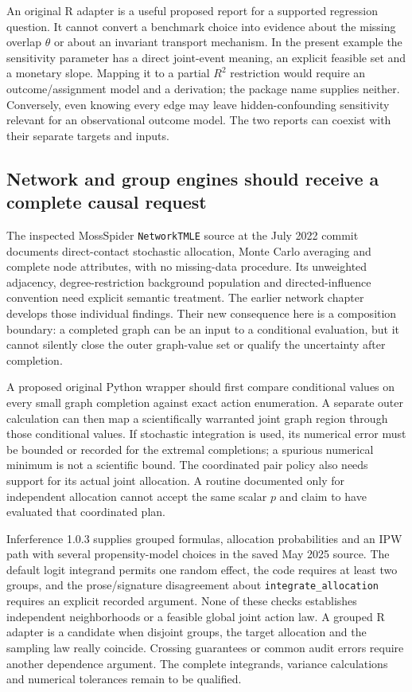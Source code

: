 An original R adapter is a useful proposed report for a supported regression
question. It cannot convert a benchmark choice into evidence about the
missing overlap $\theta$ or about an invariant transport mechanism. In the
present example the sensitivity parameter has a direct joint-event meaning,
an explicit feasible set and a monetary slope. Mapping it to a partial
$R^2$ restriction would require an outcome/assignment model and a derivation;
the package name supplies neither. Conversely, even knowing every edge may
leave hidden-confounding sensitivity relevant for an observational outcome
model. The two reports can coexist with their separate targets and inputs.

\subsection{Network and group engines should receive a complete causal request}

The inspected MossSpider \texttt{NetworkTMLE} source at the July 2022 commit
documents direct-contact stochastic allocation, Monte Carlo averaging and
complete node attributes, with no missing-data procedure. Its unweighted
adjacency, degree-restriction background population and directed-influence
convention need explicit semantic treatment.\citep{v13_sw_mossspider}
The earlier network chapter develops those individual findings. Their new
consequence here is a composition boundary: a completed graph can be an
input to a conditional evaluation, but it cannot silently close the outer
graph-value set or qualify the uncertainty after completion.

A proposed original Python wrapper should first compare conditional values
on every small graph completion against exact action enumeration. A separate
outer calculation can then map a scientifically warranted joint graph region
through those conditional values. If stochastic integration is used, its
numerical error must be bounded or recorded for the extremal completions;
a spurious numerical minimum is not a scientific bound. The coordinated
pair policy also needs support for its actual joint allocation. A routine
documented only for independent allocation cannot accept the same scalar
$p$ and claim to have evaluated that coordinated plan.

Inferference 1.0.3 supplies grouped formulas, allocation probabilities and an
IPW path with several propensity-model choices in the saved May 2025 source.
The default logit integrand permits one random effect, the code requires at
least two groups, and the prose/signature disagreement about
\texttt{integrate\_allocation} requires an explicit recorded argument.
\citep{v13_sw_inferference} None of these checks establishes independent
neighborhoods or a feasible global joint action law. A grouped R adapter is
a candidate when disjoint groups, the target allocation and the sampling law
really coincide. Crossing guarantees or common audit errors require another
dependence argument. The complete integrands, variance calculations and
numerical tolerances remain to be qualified.


